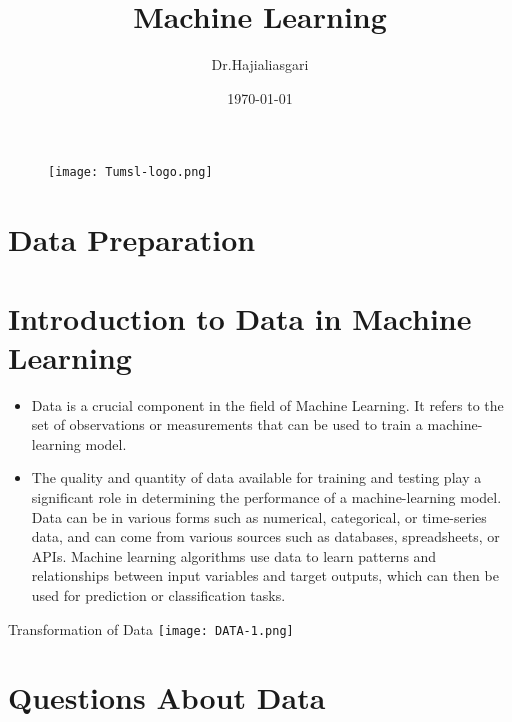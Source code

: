 \documentclass[serif, aspectratio=169]{beamer}
\author{Dr.Hajialiasgari}
\title{Machine Learning}
\institute{
    Tehran University \\
    Of\\
    Medical Science
}
\date{\small \today}
\begin{document}
\begin{frame}
    \titlepage
    \vspace*{-0.6cm}
    \begin{figure}[htpb]
        \begin{center}
            \texttt{[image: Tumsl-logo.png]}
        \end{center}
    \end{figure}
\end{frame}

\begin{frame}    
\tableofcontents[sectionstyle=show, subsectionstyle=show/shaded/hide, subsubsectionstyle=show/shaded/hide]
\end{frame}

\section{Data Preparation}

\section{Introduction to Data in Machine Learning}
\begin{frame}
    \begin{itemize}
        \item Data is a crucial component in the field of Machine Learning. It refers to the set of observations or measurements that can be used to train a machine-learning model. 
        \item The quality and quantity of data available for training and testing play a significant role in determining the performance of a machine-learning model. Data can be in various forms such as numerical, categorical, or time-series data, and can come from various sources such as databases, spreadsheets, or APIs. Machine learning algorithms use data to learn patterns and relationships between input variables and target outputs, which can then be used for prediction or classification tasks.
    \end{itemize}
\end{frame}

\begin{frame}{Transformation of Data}
    \centering
    \texttt{[image: DATA-1.png]}
\end{frame}

\section{Questions About Data}
\end{document}
